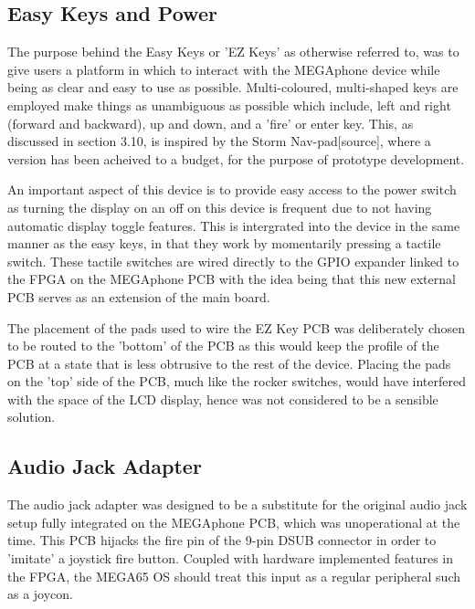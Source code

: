 \subsection{Easy Keys and Power}

The purpose behind the Easy Keys or 'EZ Keys' as otherwise referred to, was to give users a platform in which to interact with the MEGAphone device while being as clear and easy to use as possible.
Multi-coloured, multi-shaped keys are employed make things as unambiguous as possible which include, left and right (forward and backward), up and down, and a 'fire' or enter key.
This, as discussed in section 3.10, is inspired by the Storm Nav-pad[source], where a version has been acheived to a budget, for the purpose of prototype development. %

An important aspect of this device is to provide easy access to the power switch as turning the display on an off on this device is frequent due to not having automatic display toggle features.
This is intergrated into the device in the same manner as the easy keys, in that they work by momentarily pressing a tactile switch.
These tactile switches are wired directly to the GPIO expander linked to the FPGA on the MEGAphone PCB with the idea being that this new external PCB serves as an extension of the main board.

The placement of the pads used to wire the EZ Key PCB was deliberately chosen to be routed to the 'bottom' of the PCB as this would keep the profile of the PCB at a state that is less obtrusive to the rest of the device.
Placing the pads on the 'top' side of the PCB, much like the rocker switches, would have interfered with the space of the LCD display, hence was not considered to be a sensible solution.


\subsection{Audio Jack Adapter}

The audio jack adapter was designed to be a substitute for the original audio jack setup fully integrated on the MEGAphone PCB, which was unoperational at the time.
This PCB hijacks the fire pin of the 9-pin DSUB connector in order to 'imitate' a joystick fire button. 
Coupled with hardware implemented features in the FPGA, the MEGA65 OS should treat this input as a regular peripheral such as a joycon.

